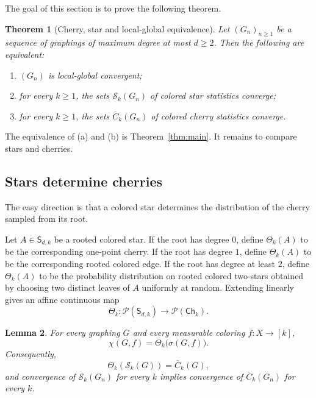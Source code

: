\documentclass[11pt]{amsart}
\newcommand{\calP}{\mathcal P}
\newcommand{\calS}{\mathcal S}
\newtheorem{theorem}{Theorem}[section]
\newtheorem{lemma}[theorem]{Lemma}
\theoremstyle{remark}
\begin{document}
The goal of this section is to prove the following theorem.

\begin{theorem}[Cherry, star and local-global equivalence]\label{thm:cherry-equivalence}
Let $(G_n)_{n\geq 1}$ be a sequence of graphings of maximum degree at most $d\geq 2$. Then the following are equivalent:
\begin{enumerate}[label=(\alph*)]
 \item $(G_n)$ is local-global convergent;
 \item for every $k\geq 1$, the sets $\calS_k(G_n)$ of colored star statistics converge;
 \item for every $k\geq 1$, the sets $\overline C_k(G_n)$ of colored cherry statistics converge.
\end{enumerate}
\end{theorem}

The equivalence of (a) and (b) is Theorem~\ref{thm:main}. It remains to compare stars and cherries.

\subsection{Stars determine cherries}

The easy direction is that a colored star determines the distribution of the cherry sampled from its root.

Let $A\in\mathsf S_{d,k}$ be a rooted colored star. If the root has degree $0$, define $\Theta_k(A)$ to be the corresponding one-point cherry. If the root has degree $1$, define $\Theta_k(A)$ to be the corresponding rooted colored edge. If the root has degree at least $2$, define $\Theta_k(A)$ to be the probability distribution on rooted colored two-stars obtained by choosing two distinct leaves of $A$ uniformly at random. Extending linearly gives an affine continuous map
\[
 \Theta_k\colon \calP(\mathsf S_{d,k})\to\calP(\mathsf{Ch}_k).
\]

\begin{lemma}\label{lem:star-to-cherry}
For every graphing $G$ and every measurable coloring $f\colon X\to[k]$,
\[
 \chi(G,f)=\Theta_k\bigl(\sigma(G,f)\bigr).
\]
Consequently,
\[
 \Theta_k(\calS_k(G))=\overline C_k(G),
\]
and convergence of $\calS_k(G_n)$ for every $k$ implies convergence of $\overline C_k(G_n)$ for every $k$.
\end{lemma}
\end{document}
